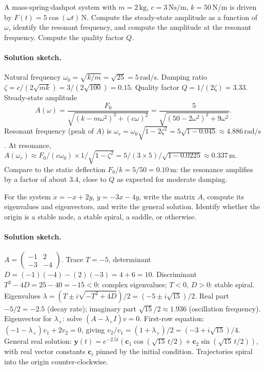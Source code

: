 \begin{exercise}
A mass-spring-dashpot system with $m = 2\,\si{\kilogram}$, $c =
3\,\si{\newton\second\per\meter}$, $k = 50\,\si{\newton\per\meter}$
is driven by $F(t) = 5\cos(\omega t)\,\si{\newton}$. Compute the
steady-state amplitude as a function of $\omega$, identify the
resonant frequency, and compute the amplitude at the resonant
frequency. Compute the quality factor $Q$.

\paragraph{Solution sketch.} Natural frequency $\omega_{0} =
\sqrt{k/m} = \sqrt{25} = 5\,\si{\radian\per\second}$. Damping
ratio $\zeta = c/(2 \sqrt{m k}) = 3/(2 \sqrt{100}) = 0.15$.
Quality factor $Q = 1/(2 \zeta) = 3.33$. Steady-state amplitude
\[
A(\omega) = \frac{F_{0}}{\sqrt{(k - m \omega^{2})^{2} + (c
\omega)^{2}}} = \frac{5}{\sqrt{(50 - 2 \omega^{2})^{2} + 9
\omega^{2}}}.
\]
Resonant frequency (peak of $A$) is $\omega_{r} = \omega_{0}
\sqrt{1 - 2 \zeta^{2}} = 5 \sqrt{1 - 0.045} \approx 4.886\,\si{
\radian\per\second}$. At resonance, $A(\omega_{r}) \approx
F_{0}/(c \omega_{0}) \times 1/\sqrt{1 - \zeta^{2}} = 5/(3 \times
5) / \sqrt{1 - 0.0225} \approx 0.337\,\si{\meter}$. Compare to
the static deflection $F_{0}/k = 5/50 = 0.10\,\si{\meter}$: the
resonance amplifies by a factor of about $3.4$, close to $Q$ as
expected for moderate damping.
\end{exercise}

\begin{exercise}
For the system $\dot{x} = -x + 2 y$, $\dot{y} = -3 x - 4 y$,
write the matrix $A$, compute its eigenvalues and eigenvectors,
and write the general solution. Identify whether the origin is a
stable node, a stable spiral, a saddle, or otherwise.

\paragraph{Solution sketch.} $A = \begin{pmatrix} -1 & 2 \\ -3 &
-4 \end{pmatrix}$. Trace $T = -5$, determinant $D = (-1)(-4) -
(2)(-3) = 4 + 6 = 10$. Discriminant $T^{2} - 4 D = 25 - 40 = -15
< 0$: complex eigenvalues; $T < 0$, $D > 0$: stable spiral.
Eigenvalues $\lambda = (T \pm i \sqrt{-T^{2} + 4 D})/2 = (-5 \pm
i \sqrt{15})/2$. Real part $-5/2 = -2.5$ (decay rate); imaginary
part $\sqrt{15}/2 \approx 1.936$ (oscillation frequency).
Eigenvector for $\lambda_{+}$: solve $(A - \lambda_{+} I) v = 0$.
First-row equation: $(-1 - \lambda_{+}) v_{1} + 2 v_{2} = 0$,
giving $v_{2}/v_{1} = (1 + \lambda_{+})/2 = (-3 + i\sqrt{15})/4$.
General real solution: $\mathbf{y}(t) = e^{-2.5 t}(\mathbf{c}_{1}
\cos(\sqrt{15}\, t/2) + \mathbf{c}_{2} \sin(\sqrt{15}\, t/2))$,
with real vector constants $\mathbf{c}_{i}$ pinned by the initial
condition. Trajectories spiral into the origin counter-clockwise.
\end{exercise}

